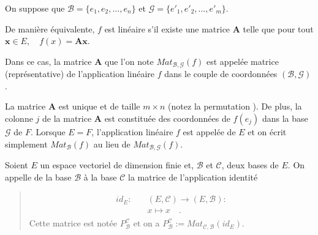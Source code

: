 \documentclass[letterpaper,11pt,english]{sphinxmanual}
\begin{document}
\begin{DUlineblock}{0em}
\item[] On suppose que \(\mathcal{B}=\{e_1, e_2, \dots, e_n\}\) et
\(\mathcal{G}=\{e'_1, e'_2, \dots, e'_m\}\).
\item[] De manière équivalente, \(f\) est linéaire s’il existe une matrice
\(\mathbf{A}\) telle que pour tout
\(\mathbf{x}\in E, \quad f(x)=\mathbf{A}\mathbf{x}\).
\item[] Dans ce cas, la matrice \(\mathbf{A}\) que l’on note
\(Mat_{\mathcal{B},\mathcal{G}}(f)\) est appelée matrice
(représentative) de l’application linéaire \(f\) dans le couple de
coordonnées \((\mathcal{B},\mathcal{G})\).
\item[] La matrice \(\mathbf{A}\) est unique et de taille
\(m\times n\) (notez la permutation ). De plus, la colonne \(j\) de la matrice
\(\mathbf{A}\) est constituée des coordonnées de \(f(e_j)\)
dans la base \(\mathcal{G}\) de \(F\). Lorsque \(E=F\),
l’application linéaire \(f\) est appelée  de
\(E\) et on écrit simplement \(Mat_{\mathcal{B}}(f)\) au lieu
de \(Mat_{\mathcal{B},\mathcal{G}}(f)\).
\end{DUlineblock}

\begin{DUlineblock}{0em}
\item[]  Soient \(E\) un espace vectoriel de dimension
finie et, \(\mathcal{B}\) et \(\mathcal{C}\), deux bases de
\(E\). On appelle  de la base
\(\mathcal{B}\) à la base \(\mathcal{C}\) la matrice de
l’application identité
\end{DUlineblock}
\begin{quote}
\begin{equation}\label{equation:chapter2:chapter2:9}
\begin{split}\begin{aligned}
    id_E: \quad &(E, \mathcal{C})\rightarrow (E, \mathcal{B}):\\
    & x \mapsto x\quad .\end{aligned}\end{split}
\end{equation}
\sphinxAtStartPar
Cette matrice est notée \(P_{\mathcal{B}}^{\mathcal{C}}\) et on
a
\(P_{\mathcal{B}}^{\mathcal{C}}:=Mat_{\mathcal{C},\mathcal{B}}(id_E)\).
\end{quote}
\end{document}
